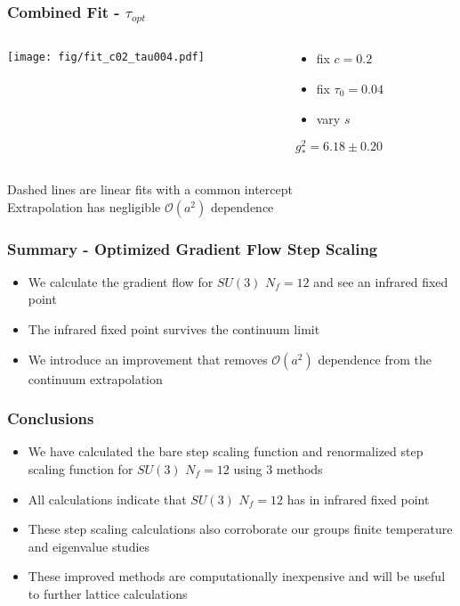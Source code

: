 \begin{frame}
  \frametitle{Combined Fit - $\tau_{opt}$}
  \begin{columns}[T]
    \begin{column}{.7\textwidth}
      \texttt{[image: fig/fit\_c02\_tau004.pdf]}
    \end{column}
    \begin{column}{.3\textwidth}
      \begin{itemize}
        \item fix $c=0.2$
        \item fix $\tau_0=0.04$
        \item vary $s$
      \end{itemize}
      \vspace{24pt}
      $g^2_*=6.18\pm0.20$
    \end{column}
  \end{columns}
  \vspace{12pt}
  Dashed lines are linear fits with a common intercept\\
  Extrapolation has negligible $\mathcal{O}(a^2)$ dependence
\end{frame}

\begin{frame}
  \frametitle{Summary - Optimized Gradient Flow Step Scaling}
  \begin{itemize}
    \item We calculate the gradient flow for $SU(3)$ $N_f=12$ and see an infrared fixed point 
    \item The infrared fixed point survives the continuum limit
    \item We introduce an improvement that removes $\mathcal{O}(a^2)$ dependence
from the continuum extrapolation
  \end{itemize}
\end{frame}

\begin{frame}
  \frametitle{Conclusions}
  \begin{itemize}
    \item We have calculated the bare step scaling function and renormalized step scaling function for $SU(3)$ $N_f=12$ using 3 methods
    \item All calculations indicate that $SU(3)$ $N_f=12$ has in infrared fixed point
    \item These step scaling calculations also corroborate our groups finite temperature and eigenvalue studies
    \item These improved methods are computationally inexpensive and will be useful to further lattice calculations
  \end{itemize}
\end{frame}

